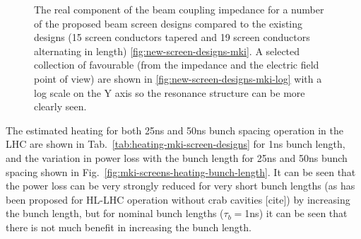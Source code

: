 \begin{figure}
\begin{center}
\end{center}
\caption{The real component of the beam coupling impedance for a number of the proposed beam screen designs compared to the existing designs (15 screen conductors tapered and 19 screen conductors alternating in length) \ref{fig:new-screen-designs-mki}. A selected collection of favourable (from the impedance and the electric field point of view) are shown in \ref{fig:new-screen-designs-mki-log} with a log scale on the Y axis so the resonance structure can be more clearly seen.}
\end{figure}

The estimated heating for both 25ns and 50ns bunch spacing operation in the LHC are shown in Tab.~\ref{tab:heating-mki-screen-designs} for 1ns bunch length, and the variation in power loss with the bunch length for 25ns and 50ns bunch spacing shown in Fig.~\ref{fig:mki-screens-heating-bunch-length}. It can be seen that the power loss can be very strongly reduced for very short bunch lengths (as has been proposed for HL-LHC operation without crab cavities [cite]) by increasing the bunch length, but for nominal bunch lengths ($\tau_{b}=$1ns) it can be seen that there is not much benefit in increasing the bunch length.

